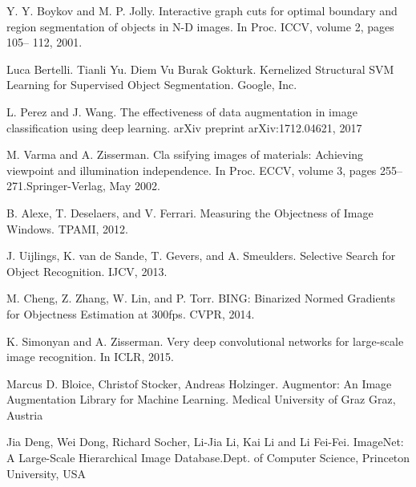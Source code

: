 \documentclass[12pt]{report}
\begin{document}
\begin{thebibliography}{9}
			Y. Y. Boykov and M. P. Jolly. Interactive graph cuts for optimal boundary and region segmentation of objects in N-D images. In Proc. ICCV, volume 2, pages 105– 112, 2001.
																																																																																															
			Luca Bertelli. Tianli Yu. Diem Vu Burak Gokturk. Kernelized Structural SVM Learning for Supervised Object Segmentation. Google, Inc.
																																																		
			L. Perez and J. Wang. The effectiveness of data augmentation in image classification using deep learning. arXiv preprint arXiv:1712.04621, 2017
																																																																																										
			M. Varma and A. Zisserman. Cla	ssifying images of materials: Achieving viewpoint and illumination independence. In Proc. ECCV, volume 3, pages 255–271.Springer-Verlag, May 2002.	
																																																																																													
			B. Alexe, T. Deselaers, and V. Ferrari. Measuring the Objectness of Image Windows. TPAMI, 2012.
																																																																																										
			J. Uijlings, K. van de Sande, T. Gevers, and A. Smeulders. Selective Search for Object Recognition. IJCV, 2013.
																																																																																										
			M. Cheng, Z. Zhang, W. Lin, and P. Torr. BING: Binarized Normed Gradients for Objectness Estimation at 300fps. CVPR, 2014.
																																																																																										
			K. Simonyan and A. Zisserman. Very deep convolutional networks for large-scale image recognition. In ICLR, 2015.
																																																																																										
			Marcus D. Bloice, Christof Stocker, Andreas Holzinger. Augmentor: An Image Augmentation Library for Machine Learning. Medical University of Graz Graz, Austria
			
			Jia Deng, Wei Dong, Richard Socher, Li-Jia Li, Kai Li and Li Fei-Fei. ImageNet: A Large-Scale Hierarchical Image Database.Dept. of Computer Science, Princeton University, USA
			

\end{thebibliography}
\end{document}
